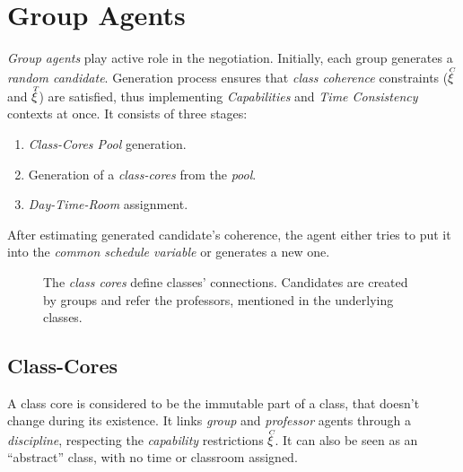 \documentclass[../../ThesisDoc]{subfiles}
\begin{document}
\providecommand{\rootdir}{../..}


\section{Group Agents}

\emph{Group agents} play active role in the negotiation.
Initially, each group generates a \emph{random candidate}.
Generation process ensures that \emph{class coherence} constraints
($\accentset{C}{\xi}$ and $\accentset{T}{\xi}$) are satisfied, thus implementing \textit{Capabilities}
and \textit{Time Consistency} contexts at once. It consists of three stages:
\begin{enumerate}
  \item \emph{Class-Cores Pool} generation.
  \item Generation of a \emph{class-cores} from the \emph{pool}.
  \item \emph{Day-Time-Room} assignment.
\end{enumerate}


\noindent
After estimating generated candidate's coherence, the agent either tries to put
it into the \emph{common schedule variable} or generates a new one.



\begin{figure}[H]
  \centering
  
  \caption[Class cores and candidates]
          {The \emph{class cores} define classes' connections. Candidates are
           created by groups and refer the professors, mentioned in the
           underlying classes. }
  \label{fig:class-cores}
\end{figure}

\subsection{Class-Cores}
\label{sec:solution-CC}

A class core is considered to be the immutable part of a class, that doesn't
change during its existence. It links \emph{group} and \emph{professor} agents
through a \emph{discipline}, respecting the \emph{capability} restrictions $\accentset{C}{\xi}$.
It can also be seen as an ``abstract'' class, with no time or classroom assigned.
\end{document}
